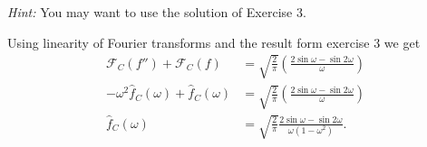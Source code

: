 \textit{Hint:} You may want to use the solution of Exercise 3.

\hr

Using linearity of Fourier transforms and the result form exercise 3 we get
\begin{align*}
  \mathcal{F}_C(f'') + \mathcal{F}_C (f) &= \sqrt{\frac{2}{\pi}} \left( \frac{2 \sin \omega - \sin 2 \omega}{\omega} \right) \\
  - \omega^2 \hat{f}_C (\omega) + \hat{f}_C (\omega) &= \sqrt{\frac{2}{\pi}} \left( \frac{2 \sin \omega - \sin 2\omega}{\omega} \right) \\
  \hat{f}_C (\omega) &= \sqrt{\frac{2}{\pi}} \frac{2 \sin \omega - \sin 2\omega}{\omega \left( 1 - \omega^2 \right)}
.\end{align*}
